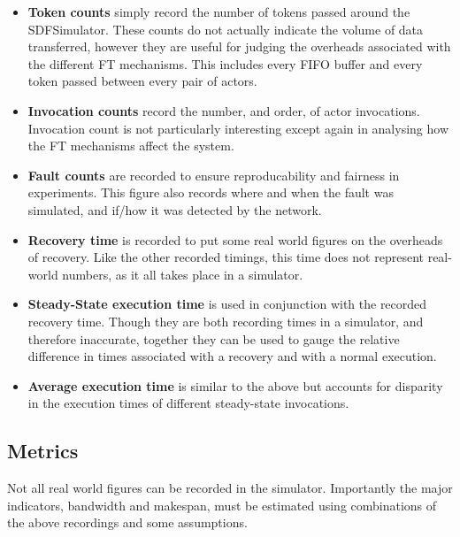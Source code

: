 \begin{itemize}
	\item {\bf Token counts} simply record the number of tokens passed around the SDFSimulator.
			These counts do not actually indicate the volume of data transferred, however they are useful for judging the overheads associated with the different FT mechanisms.
			This includes every FIFO buffer and every token passed between every pair of actors.
	\item {\bf Invocation counts} record the number, and order, of actor invocations.
			Invocation count is not particularly interesting except again in analysing how the FT mechanisms affect the system.
	\item {\bf Fault counts} are recorded to ensure reproducability and fairness in experiments.
			This figure also records where and when the fault was simulated, and if/how it was detected by the network.
	\item {\bf Recovery time} is recorded to put some real world figures on the overheads of recovery.
			Like the other recorded timings, this time does not represent real-world numbers, as it all takes place in a simulator.
	\item {\bf Steady-State execution time} is used in conjunction with the recorded recovery time.
			Though they are both recording times in a simulator, and therefore inaccurate, together they can be used to gauge the relative difference in times associated with a recovery and with a normal execution.
	\item {\bf Average execution time} is similar to the above but accounts for disparity in the execution times of different steady-state invocations.
\end{itemize}

\subsection{Metrics}
\label{secSystemMetrics}

Not all real world figures can be recorded in the simulator.
Importantly the major indicators, bandwidth and makespan, must be estimated using combinations of the above recordings and some assumptions.


